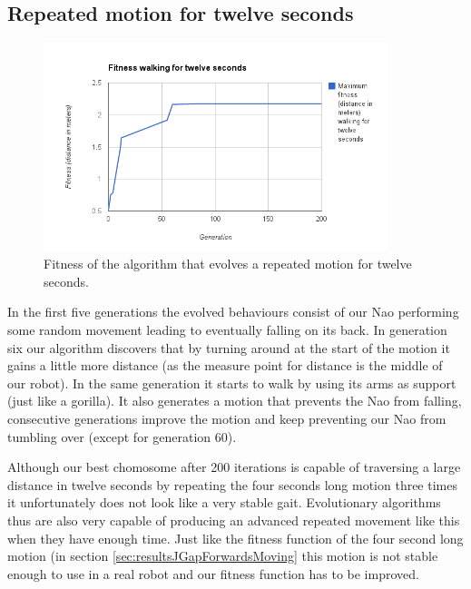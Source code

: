 \documentclass[a4paper,10pt]{article}
\begin{document}
\subsection{Repeated motion for twelve seconds}
\label{sec:resultsJGapForwardsMovingTwelveSeconds}
\begin{figure}[h!]
\includegraphics[width=100mm]{images/walkingtwelve}
\caption{Fitness of the algorithm that evolves a repeated motion for twelve seconds.}
\label{fig:walkingLongFitness}
\end{figure}

In the first five generations the evolved behaviours consist of our Nao performing some random movement leading to eventually falling on its back. In generation six our algorithm discovers that by turning around at the start of the motion it gains a little more distance (as the measure point for distance is the middle of our robot). In the same generation it starts to walk by using its arms as support (just like a gorilla). It also generates a motion that prevents the Nao from falling, consecutive generations improve the motion and keep preventing our Nao from tumbling over (except for generation 60).

Although our best chomosome after 200 iterations is capable of traversing a large distance in twelve seconds by repeating the four seconds long motion three times it unfortunately does not look like a very stable gait. Evolutionary algorithms thus are also very capable of producing an advanced repeated movement like this when they have enough time. Just like the fitness function of the four second long motion (in section \ref{sec:resultsJGapForwardsMoving} this motion is not stable enough to use in a real robot and our fitness function has to be improved. 
\end{document}
